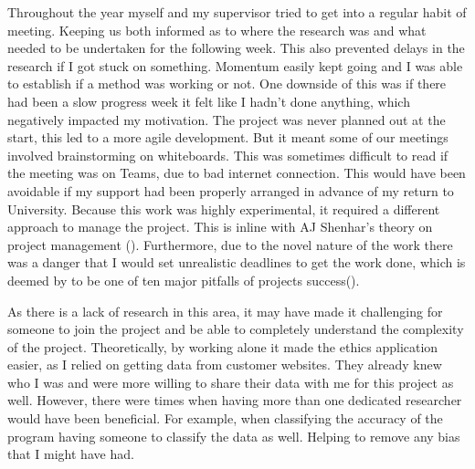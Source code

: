 Throughout the year myself and my supervisor tried to get into a regular habit of meeting. Keeping us both informed as to where the research was and what needed to be undertaken for the following week. This also prevented delays in the research if I got stuck on something. Momentum easily kept going and I was able to establish if a method was working or not. One downside of this was if there had been a slow progress week it felt like I hadn't done anything, which negatively impacted my motivation. The project was never planned out at the start, this led to a more agile development. But it meant some of our meetings involved brainstorming on whiteboards. This was sometimes difficult to read if the meeting was on Teams, due to bad internet connection. This would have been avoidable if my support had been properly arranged in advance of my return to University. Because this work was highly experimental, it required a different approach to manage the project. This is inline with AJ Shenhar's theory on project management (\cite{Shenhar1}). Furthermore, due to the novel nature of the work there was a danger that I would set unrealistic deadlines to get the work done, which is deemed by \citeauthor{GanttPRO} to be one of ten major pitfalls of projects success(\cite{GanttPRO}).



As there is a lack of research in this area, it may have made it challenging for someone to join the project and be able to completely understand the complexity of the project. Theoretically, by working alone it made the ethics application easier, as I relied on getting data from customer websites. They already knew who I was and were more willing to share their data with me for this project as well. However, there were times when having more than one dedicated researcher would have been beneficial. For example, when classifying the accuracy of the program having someone to classify the data as well. Helping to remove any bias that I might have had.

